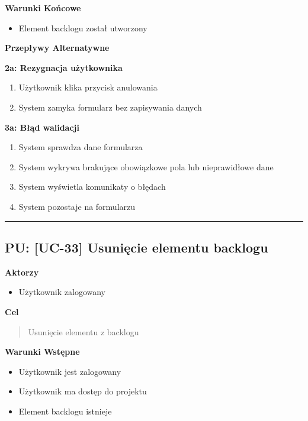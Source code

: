 \vspace{0.2cm}
\noindent\textbf{Warunki Końcowe}
\begin{itemize}
    \item Element backlogu został utworzony
\end{itemize}

\vspace{0.2cm}
\noindent\textbf{Przepływy Alternatywne}

\textbf{2a: Rezygnacja użytkownika}
\begin{enumerate}
    \item Użytkownik klika przycisk anulowania
    \item System zamyka formularz bez zapisywania danych
\end{enumerate}

\textbf{3a: Błąd walidacji}
\begin{enumerate}
    \item System sprawdza dane formularza
    \item System wykrywa brakujące obowiązkowe pola lub nieprawidłowe dane
    \item System wyświetla komunikaty o błędach
    \item System pozostaje na formularzu
\end{enumerate}


\hrule
\vspace{1cm}

\subsection*{PU: [UC-33] Usunięcie elementu backlogu}

\noindent\textbf{Aktorzy}
\begin{itemize}
    \item Użytkownik zalogowany
\end{itemize}

\vspace{0.2cm}
\noindent\textbf{Cel}
\begin{quote}
    Usunięcie elementu z backlogu
\end{quote}

\vspace{0.2cm}
\noindent\textbf{Warunki Wstępne}
\begin{itemize}
    \item Użytkownik jest zalogowany
    \item Użytkownik ma dostęp do projektu
    \item Element backlogu istnieje
\end{itemize}

